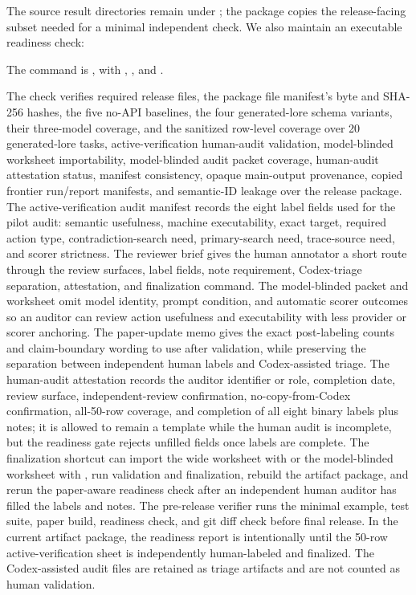 The source result directories remain under ; the package copies the release-facing subset needed for a minimal independent check. We also maintain an executable readiness check:

The command is , with , , and .

The check verifies required release files, the package file manifest's byte and SHA-256 hashes, the five no-API baselines, the four generated-lore schema variants, their three-model coverage, and the sanitized row-level coverage over 20 generated-lore tasks, active-verification human-audit validation, model-blinded worksheet importability, model-blinded audit packet coverage, human-audit attestation status, manifest consistency, opaque main-output provenance, copied frontier run/report manifests, and semantic-ID leakage over the release package. The active-verification audit manifest records the eight label fields used for the pilot audit: semantic usefulness, machine executability, exact target, required action type, contradiction-search need, primary-search need, trace-source need, and scorer strictness. The reviewer brief gives the human annotator a short route through the review surfaces, label fields, note requirement, Codex-triage separation, attestation, and finalization command. The model-blinded packet and worksheet omit model identity, prompt condition, and automatic scorer outcomes so an auditor can review action usefulness and executability with less provider or scorer anchoring. The paper-update memo gives the exact post-labeling counts and claim-boundary wording to use after validation, while preserving the separation between independent human labels and Codex-assisted triage. The human-audit attestation records the auditor identifier or role, completion date, review surface, independent-review confirmation, no-copy-from-Codex confirmation, all-50-row coverage, and completion of all eight binary labels plus notes; it is allowed to remain a template while the human audit is incomplete, but the readiness gate rejects unfilled fields once labels are complete. The finalization shortcut can import the wide worksheet with  or the model-blinded worksheet with , run validation and finalization, rebuild the artifact package, and rerun the paper-aware readiness check after an independent human auditor has filled the labels and notes. The pre-release verifier runs the minimal example, test suite, paper build, readiness check, and git diff check before final release. In the current artifact package, the readiness report is intentionally  until the 50-row active-verification sheet is independently human-labeled and finalized. The Codex-assisted audit files are retained as triage artifacts and are not counted as human validation.
